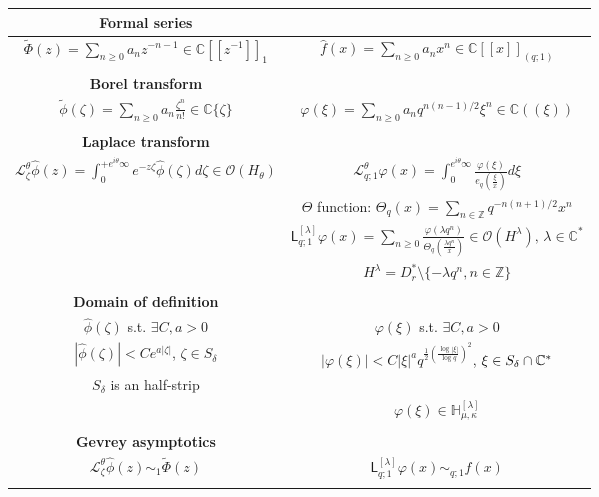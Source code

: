 \documentclass[11pt,a4paper,twoside,leqno,noamsfonts]{amsart}
\numberwithin{equation}{section}
\begin{document}
\begin{center}
\begin{tabular}{c|c}
\hline
\textbf{Formal series} & \\
\hline
$\tilde{\Phi}(z)=\sum_{n\geq 0} a_n z^{-n-1}\in\mathbb{C}[\![z^{-1}]\!]_1$     &  $\hat{f}(x)=\sum_{n\geq 0}a_n x^n\in\mathbb{C}[\![x]\!]_{(q;1)}$ \\
& \\
\hline
\textbf{Borel transform} & \\
\hline
  $\tilde{\phi}(\zeta)=\sum_{n\geq0}a_n\frac{\zeta^n}{n!}\in\mathbb{C}\lbrace \zeta\rbrace$   & $\varphi(\xi)=\sum_{n\geq 0}a_n q^{n(n-1)/2}\xi^n \in\mathbb{C}(\!(\xi)\!)$\\
  & \\
  \hline
  \textbf{Laplace transform} & \\
  \hline
 $\mathcal{L}_\zeta^{\theta}\hat{\phi}(z)=\int_0^{+e^{i\theta}\infty} e^{-z\zeta}\hat{\phi}(\zeta)d\zeta\in\mathcal{O}(H_\theta)$ & $\mathcal{L}^{\theta}_{q;1}\varphi(x)=\int_0^{e^{i\theta} \infty}\frac{\varphi(\xi)}{e_q(\frac{\xi}{x})}d\xi $ \\
 & $\Theta$ function: $\Theta_q(x)=\sum_{n\in\mathbb{Z}}q^{-n(n+1)/2}x^n$\\
 & $\mathsf{L}_{q;1}^{[\lambda]}\varphi(x)=\sum_{n\geq 0}\frac{\varphi(\lambda q^n)}{\Theta_q(\frac{\lambda q^n}{x})}\in\mathcal{O}(H^{\lambda}),\, \lambda\in\mathbb{C}^*$\\
 & $H^{\lambda}=D_r^*\setminus\lbrace -\lambda q^n, n\in\mathbb{Z}\rbrace$ \\
 & \\
 \hline
 \textbf{Domain of definition} & \\
 \hline 
 $\hat{\phi}(\zeta)$ s.t. $\exists C,a>0 $ & $\varphi(\xi)$ s.t. $\exists C,a>0 $\\
 $|\hat{\phi}(\zeta)|<Ce^{a|\zeta|}$, $\zeta\in S_{\delta}$ & $|\varphi(\xi)|<C|\xi|^aq^{\frac{1}{2}\left(\frac{\log|\xi|}{\log q}\right)^2}$, $\xi\in S_{\delta}\cap\mathbb C^*$ \\
 $S_\delta$ is an half-strip& \\
 & $\varphi(\xi)\in\mathbb{H}_{\mu,\kappa}^{[\lambda]}$\\
 & \\
 \hline
 \textbf{Gevrey asymptotics} & \\
 \hline
$\mathcal{L}_{\zeta}^{\theta}\hat{\phi}(z)\sim_1 \tilde{\Phi}(z)$ & $\mathsf{L}_{q;1}^{[\lambda]}\varphi(x)\sim_{q;1} \hat{f}(x)$ \\
& \\

\end{tabular}
\end{center}
\end{document}
